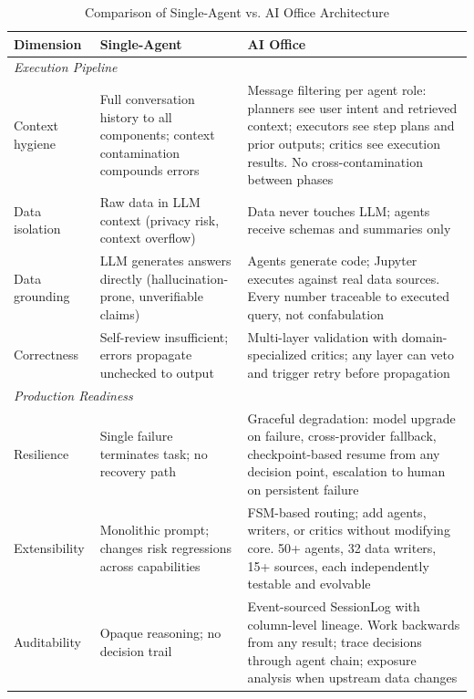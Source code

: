 \documentclass[sigconf]{acmart}
\begin{document}
\begin{table}[htbp]
\centering
\caption{Comparison of Single-Agent vs. AI Office Architecture}
\label{tab:comparison}
\small
\begin{tabular}{@{}p{2.4cm}p{5.3cm}p{7.8cm}@{}}
\toprule
\textbf{Dimension} & \textbf{Single-Agent} & \textbf{AI Office} \\
\midrule
\multicolumn{3}{l}{\textit{Execution Pipeline}} \\
\addlinespace
Context hygiene & Full conversation history to all components; context contamination compounds errors & Message filtering per agent role: planners see user intent and retrieved context; executors see step plans and prior outputs; critics see execution results. No cross-contamination between phases \\
\addlinespace
Data isolation & Raw data in LLM context (privacy risk, context overflow) & Data never touches LLM; agents receive schemas and summaries only \\
\addlinespace
Data grounding & LLM generates answers directly (hallucination-prone, unverifiable claims) & Agents generate code; Jupyter executes against real data sources. Every number traceable to executed query, not confabulation \\
\addlinespace
Correctness & Self-review insufficient; errors propagate unchecked to output & Multi-layer validation with domain-specialized critics; any layer can veto and trigger retry before propagation \\
\midrule
\multicolumn{3}{l}{\textit{Production Readiness}} \\
\addlinespace
Resilience & Single failure terminates task; no recovery path & Graceful degradation: model upgrade on failure, cross-provider fallback, checkpoint-based resume from any decision point, escalation to human on persistent failure \\
\addlinespace
Extensibility & Monolithic prompt; changes risk regressions across capabilities & FSM-based routing; add agents, writers, or critics without modifying core. 50+ agents, 32 data writers, 15+ sources, each independently testable and evolvable \\
\addlinespace
Auditability & Opaque reasoning; no decision trail & Event-sourced SessionLog with column-level lineage. Work backwards from any result; trace decisions through agent chain; exposure analysis when upstream data changes \\
\bottomrule
\end{tabular}
\end{table}
\end{document}
